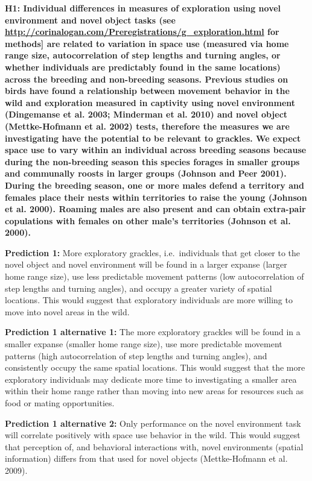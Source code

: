 \documentclass[
]{article}
\begin{document}
\textbf{H1: Individual differences in measures of exploration using
novel environment and novel object tasks (see
\url{http://corinalogan.com/Preregistrations/g_exploration.html} for
methods{]} are related to variation in space use (measured via home
range size, autocorrelation of step lengths and turning angles, or
whether individuals are predictably found in the same locations) across
the breeding and non-breeding seasons. Previous studies on birds have
found a relationship between movement behavior in the wild and
exploration measured in captivity using novel environment (Dingemanse et
al. 2003; Minderman et al. 2010) and novel object (Mettke-Hofmann et al.
2002) tests, therefore the measures we are investigating have the
potential to be relevant to grackles. We expect space use to vary within
an individual across breeding seasons because during the non-breeding
season this species forages in smaller groups and communally roosts in
larger groups (Johnson and Peer 2001). During the breeding season, one
or more males defend a territory and females place their nests within
territories to raise the young (Johnson et al. 2000). Roaming males are
also present and can obtain extra-pair copulations with females on other
male's territories (Johnson et al. 2000).}

\textbf{Prediction 1:} More exploratory grackles, i.e.~individuals that
get closer to the novel object and novel environment will be found in a
larger expanse (larger home range size), use less predictable movement
patterns (low autocorrelation of step lengths and turning angles), and
occupy a greater variety of spatial locations. This would suggest that
exploratory individuals are more willing to move into novel areas in the
wild.

\textbf{Prediction 1 alternative 1:} The more exploratory grackles will
be found in a smaller expanse (smaller home range size), use more
predictable movement patterns (high autocorrelation of step lengths and
turning angles), and consistently occupy the same spatial locations.
This would suggest that the more exploratory individuals may dedicate
more time to investigating a smaller area within their home range rather
than moving into new areas for resources such as food or mating
opportunities.

\textbf{Prediction 1 alternative 2:} Only performance on the novel
environment task will correlate positively with space use behavior in
the wild. This would suggest that perception of, and behavioral
interactions with, novel environments (spatial information) differs from
that used for novel objects (Mettke-Hofmann et al. 2009).
\end{document}
